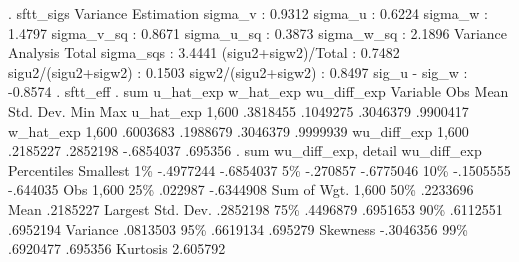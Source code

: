 . sftt_sigs
{\smallskip}
               Variance Estimation          
sigma_v    :       0.9312
sigma_u    :       0.6224
sigma_w    :       1.4797
sigma_v_sq :       0.8671
sigma_u_sq :       0.3873
sigma_w_sq :       2.1896
               Variance Analysis          
Total sigma_sqs     :  3.4441
(sigu2+sigw2)/Total :  0.7482
sigu2/(sigu2+sigw2) :  0.1503
sigw2/(sigu2+sigw2) :  0.8497
sig_u - sig_w       : -0.8574
{\smallskip}
. sftt_eff
{\smallskip}
. sum u_hat_exp w_hat_exp wu_diff_exp
{\smallskip}
    Variable {\VBAR}        Obs        Mean    Std. Dev.       Min        Max
   u_hat_exp {\VBAR}      1,600    .3818455    .1049275   .3046379   .9900417
   w_hat_exp {\VBAR}      1,600    .6003683    .1988679   .3046379   .9999939
 wu_diff_exp {\VBAR}      1,600    .2185227    .2852198  -.6854037    .695356
{\smallskip}
. sum wu_diff_exp, detail
{\smallskip}
                         wu_diff_exp
      Percentiles      Smallest
 1\%    -.4977244      -.6854037
 5\%     -.270857      -.6775046
10\%    -.1505555       -.644035       Obs               1,600
25\%      .022987      -.6344908       Sum of Wgt.       1,600
{\smallskip}
50\%     .2233696                      Mean           .2185227
                        Largest       Std. Dev.      .2852198
75\%     .4496879       .6951653
90\%     .6112551       .6952194       Variance       .0813503
95\%     .6619134        .695279       Skewness      -.3046356
99\%     .6920477        .695356       Kurtosis       2.605792
{\smallskip}
